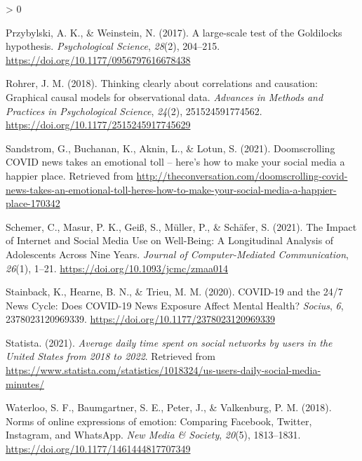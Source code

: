 \documentclass[
  english,
  man,mask,floatsintext]{apa6}
\newlength{\cslhangindent}
\newenvironment{CSLReferences}[2] %
 {%
  \setlength{\parindent}{0pt}
  \ifodd #1 \everypar{\setlength{\hangindent}{\cslhangindent}}\ignorespaces\fi
  \ifnum #2 > 0
  \setlength{\parskip}{#2\baselineskip}
  \fi
 }%
 {}
\begin{document}
\begin{CSLReferences}{1}{0}
\leavevmode\hypertarget{ref-przybylskiLargescaleTestGoldilocks2017}{}%
Przybylski, A. K., \& Weinstein, N. (2017). A large-scale test of the {Goldilocks} hypothesis. \emph{Psychological Science}, \emph{28}(2), 204--215. \url{https://doi.org/10.1177/0956797616678438}

\leavevmode\hypertarget{ref-rohrerThinkingClearlyCorrelations2018}{}%
Rohrer, J. M. (2018). Thinking clearly about correlations and causation: {Graphical} causal models for observational data. \emph{Advances in Methods and Practices in Psychological Science}, \emph{24}(2), 251524591774562. \url{https://doi.org/10.1177/2515245917745629}

\leavevmode\hypertarget{ref-sandstromDoomscrollingCOVIDNews2021}{}%
Sandstrom, G., Buchanan, K., Aknin, L., \& Lotun, S. (2021). Doomscrolling {COVID} news takes an emotional toll -- here's how to make your social media a happier place. Retrieved from \url{http://theconversation.com/doomscrolling-covid-news-takes-an-emotional-toll-heres-how-to-make-your-social-media-a-happier-place-170342}

\leavevmode\hypertarget{ref-schemerImpactInternetSocial2021}{}%
Schemer, C., Masur, P. K., Geiß, S., Müller, P., \& Schäfer, S. (2021). The {Impact} of {Internet} and {Social} {Media} {Use} on {Well}-{Being}: {A} {Longitudinal} {Analysis} of {Adolescents} {Across} {Nine} {Years}. \emph{Journal of Computer-Mediated Communication}, \emph{26}(1), 1--21. \url{https://doi.org/10.1093/jcmc/zmaa014}

\leavevmode\hypertarget{ref-stainbackCOVID1924News2020}{}%
Stainback, K., Hearne, B. N., \& Trieu, M. M. (2020). {COVID}-19 and the 24/7 {News} {Cycle}: {Does} {COVID}-19 {News} {Exposure} {Affect} {Mental} {Health}? \emph{Socius}, \emph{6}, 2378023120969339. \url{https://doi.org/10.1177/2378023120969339}

\leavevmode\hypertarget{ref-statistaAverageDailyTime2021}{}%
Statista. (2021). \emph{Average daily time spent on social networks by users in the {United} {States} from 2018 to 2022}. Retrieved from \url{https://www.statista.com/statistics/1018324/us-users-daily-social-media-minutes/}

\leavevmode\hypertarget{ref-waterlooNormsOnlineExpressions2018}{}%
Waterloo, S. F., Baumgartner, S. E., Peter, J., \& Valkenburg, P. M. (2018). Norms of online expressions of emotion: {Comparing} {Facebook}, {Twitter}, {Instagram}, and {WhatsApp}. \emph{New Media \& Society}, \emph{20}(5), 1813--1831. \url{https://doi.org/10.1177/1461444817707349}

\end{CSLReferences}
\end{document}
